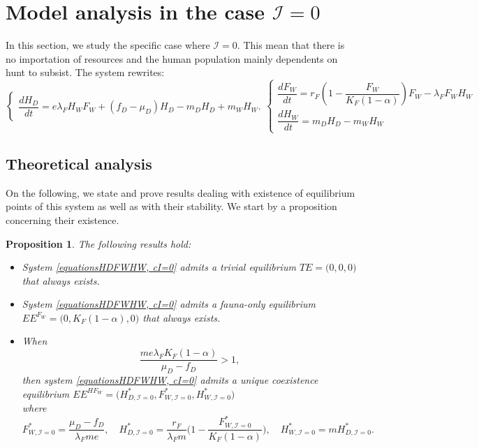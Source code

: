 \documentclass{article}
\newcommand{\lfw}{\lambda_{F}}
\newcommand{\lfw}{\lambda_{F}}
\newcommand{\cI}{\mathcal{I}}
\newtheorem{prop}{Proposition}
\begin{document}
\section{Model analysis in the case $\cI = 0$}
In this section, we study the specific case where $\cI = 0$. This mean that there is no importation of resources and the human population mainly dependents on hunt to subsist. The system rewrites:
\begin{subequations}
\begin{equation}
\left\{ \begin{array}{l}
\dfrac{dH_D}{dt}= e\lfw H_W F_W + (f_D - \mu_D) H_D - m_D H_D + m_W H_W.
\end{array}\right.
\end{equation}
\begin{equation}
\left\lbrace \begin{array}{l}
\dfrac{dF_W}{dt} = r_F \left(1 - \dfrac{F_W}{K_F(1-\alpha)} \right) F_W - \lfw F_W H_W \\
\dfrac{dH_W}{dt}= m_D H_D - m_W H_W 
\end{array} \right.
\end{equation}
\label{equationsHDFWHW, cI=0}
\end{subequations}

\subsection{Theoretical analysis}
On the following, we state and prove results dealing with existence of equilibrium points of this system as well as with their stability. We start by a proposition concerning their existence.


\begin{prop}
\label{theoremEquilibre, cI=0}
The following results hold:
\begin{itemize}
\item System \eqref{equationsHDFWHW, cI=0} admits a trivial equilibrium $TE = \Big(0,0,0\Big)$ that always exists.
\item System \eqref{equationsHDFWHW, cI=0} admits a fauna-only equilibrium $EE^{F_W} = \Big(0, K_F(1-\alpha), 0 \Big)$ that always exists.
\item When
$$
\dfrac{m e \lfw K_F(1-\alpha)}{\mu_D - f_D} >1,
$$ 
then system \eqref{equationsHDFWHW, cI=0} admits a unique coexistence equilibrium $EE^{HF_W} = \Big(H^*_{D, \cI = 0}, F^*_{W, \cI = 0}, H^*_{W, \cI = 0} \Big)$ \\ 
where 
$$F^*_{W, \cI = 0} = \dfrac{\mu_D - f_D}{\lfw m e},
\quad 
H^*_{D, \cI = 0} = \dfrac{r_F}{\lfw m} \Big(1 - \dfrac{F^*_{W, \cI = 0}}{K_F(1-\alpha)} \Big),
\quad 
H^*_{W, \cI = 0} = m H^*_{D, \cI = 0}.$$
\end{itemize}
\end{prop}
\end{document}
